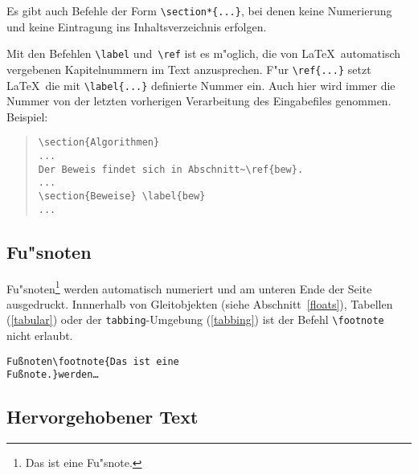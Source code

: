 Es gibt auch Befehle der Form \verb|\section*{...}|, bei denen
keine Numerierung und keine Eintragung ins Inhaltsverzeichnis
erfolgen.

Mit den Befehlen \verb|\label| und~\verb|\ref| ist es m"oglich,
die von \LaTeX\ automatisch vergebenen Kapitelnummern im Text
anzusprechen.
F"ur \verb|\ref{...}| setzt \LaTeX\ die
mit \verb|\label{...}| definierte Nummer ein.
Auch hier wird immer die Nummer von der letzten vorherigen
Verarbeitung des Eingabefiles genommen.
Beispiel:
\begin{quote}
\begin{verbatim}
\section{Algorithmen}
...
Der Beweis findet sich in Abschnitt~\ref{bew}.
...
\section{Beweise} \label{bew}
...
\end{verbatim}
\end{quote}
 
 
\subsection{Fu"snoten}
 
Fu"snoten\footnote{Das 
ist eine Fu"snote.} werden automatisch numeriert
und am unteren Ende der Seite ausgedruckt.  
Innnerhalb von Gleitobjekten (siehe Abschnitt~\ref{floats}), 
Tabellen (\ref{tabular}) oder der \texttt{tabbing}-Umgebung (\ref{tabbing})
ist der Befehl \verb|\footnote| nicht erlaubt.
\exa
~
\exb
\begin{alltt}
Fu\ss{}noten\verb+\footnote{Das ist eine+
Fu\ss{}note.\verb+}+ werden \dots
\end{alltt}
\exc
 
 
 
\subsection{Hervorgehobener Text}
 

